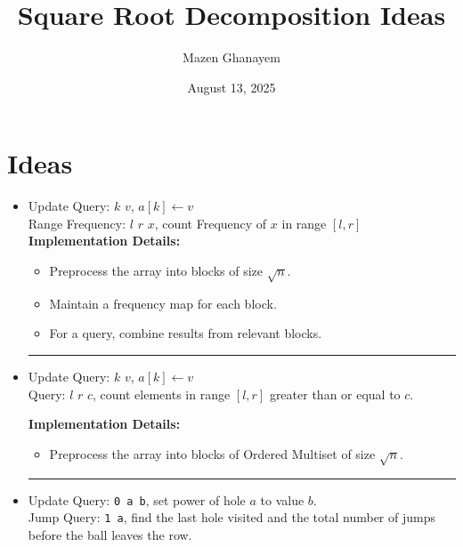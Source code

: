 \documentclass[10pt]{article}
\title{Square Root Decomposition Ideas}
\author{Mazen Ghanayem}
\date{August 13, 2025}
\begin{document}
\maketitle

\section{Ideas}
\begin{itemize}
\item {
    Update Query: $k$ $v$, $a[k] \leftarrow v$ \\
    Range Frequency: $l$ $r$ $x$, count Frequency of $x$ in range $[l, r]$ \\
    
    \textbf{Implementation Details:}
    \begin{itemize}
    \item Preprocess the array into blocks of size $\sqrt{n}$.
    \item Maintain a frequency map for each block.
    \item For a query, combine results from relevant blocks.
    \end{itemize}
}
\rule{\linewidth}{1pt}
\item {
    Update Query: $k$ $v$, $a[k] \leftarrow v$ \\
    Query: $l$ $r$ $c$, count elements in range $[l, r]$ greater than or equal to $c$.

    \textbf{Implementation Details:}
    \begin{itemize}
    \item Preprocess the array into blocks of Ordered Multiset of size $\sqrt{n}$.
    \end{itemize}
}
\rule{\linewidth}{1pt}
\item {
    Update Query: \texttt{0 a b}, set power of hole $a$ to value $b$. \\
    Jump Query: \texttt{1 a}, find the last hole visited and the total number of jumps before the ball leaves the row.

}
\end{itemize}
\end{document}
